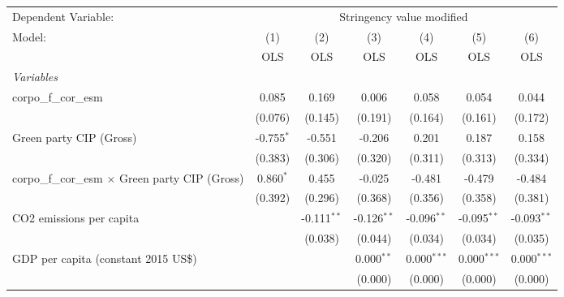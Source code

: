 
\begingroup
\centering
\begin{tabular}{lcccccc}
   \toprule
   Dependent Variable: & \multicolumn{6}{c}{Stringency value modified}\\
   Model:                                                  & (1)          & (2)           & (3)           & (4)           & (5)           & (6)\\  
                                                           &  OLS         & OLS           & OLS           & OLS           & OLS           & OLS\\  
   \midrule
   \emph{Variables}\\
   corpo\_f\_cor\_esm                                      & 0.085        & 0.169         & 0.006         & 0.058         & 0.054         & 0.044\\   
                                                           & (0.076)      & (0.145)       & (0.191)       & (0.164)       & (0.161)       & (0.172)\\   
   Green party CIP (Gross)                                 & -0.755$^{*}$ & -0.551        & -0.206        & 0.201         & 0.187         & 0.158\\   
                                                           & (0.383)      & (0.306)       & (0.320)       & (0.311)       & (0.313)       & (0.334)\\   
   corpo\_f\_cor\_esm $\times$ Green party CIP (Gross)     & 0.860$^{*}$  & 0.455         & -0.025        & -0.481        & -0.479        & -0.484\\   
                                                           & (0.392)      & (0.296)       & (0.368)       & (0.356)       & (0.358)       & (0.381)\\   
   CO2 emissions per capita                                &              & -0.111$^{**}$ & -0.126$^{**}$ & -0.096$^{**}$ & -0.095$^{**}$ & -0.093$^{**}$\\   
                                                           &              & (0.038)       & (0.044)       & (0.034)       & (0.034)       & (0.035)\\   
   GDP per capita (constant 2015 US\$)                     &              &               & 0.000$^{**}$  & 0.000$^{***}$ & 0.000$^{***}$ & 0.000$^{***}$\\   
                                                           &              &               & (0.000)       & (0.000)       & (0.000)       & (0.000)\\   

\end{tabular}
